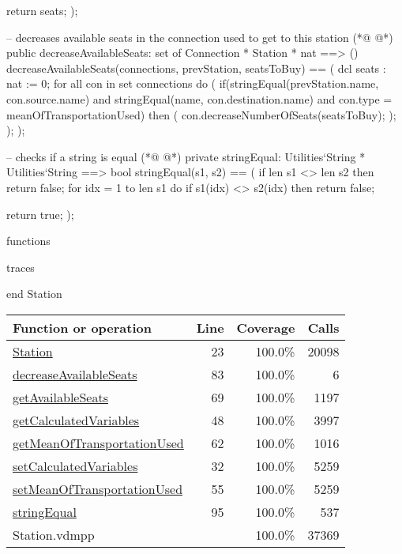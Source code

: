 \begin{vdmpp}[breaklines=true]
  return seats;
 );
 
 -- decreases available seats in the connection used to get to this station
(*@
\label{decreaseAvailableSeats:83}
@*)
 public decreaseAvailableSeats: set of Connection * Station * nat ==> ()
 decreaseAvailableSeats(connections, prevStation, seatsToBuy) ==
 (
  dcl seats : nat := 0;
  for all con in set connections do (
   if(stringEqual(prevStation.name, con.source.name) and stringEqual(name, con.destination.name) and con.type = meanOfTransportationUsed) then (
    con.decreaseNumberOfSeats(seatsToBuy);
   );
  );
 );
 
 -- checks if a string is equal
(*@
\label{stringEqual:95}
@*)
 private stringEqual: Utilities`String * Utilities`String ==> bool
 stringEqual(s1, s2) ==
 (
  if len s1 <> len s2 then
   return false;
  for idx = 1 to len s1 do
   if s1(idx) <> s2(idx) then return false;
  
  return true;
 );

 
functions

traces

end Station
\end{vdmpp}
\bigskip
\begin{longtable}{|l|r|r|r|}
\hline
Function or operation & Line & Coverage & Calls \\
\hline
\hline
\hyperref[Station:23]{Station} & 23&100.0\% & 20098 \\
\hline
\hyperref[decreaseAvailableSeats:83]{decreaseAvailableSeats} & 83&100.0\% & 6 \\
\hline
\hyperref[getAvailableSeats:69]{getAvailableSeats} & 69&100.0\% & 1197 \\
\hline
\hyperref[getCalculatedVariables:48]{getCalculatedVariables} & 48&100.0\% & 3997 \\
\hline
\hyperref[getMeanOfTransportationUsed:62]{getMeanOfTransportationUsed} & 62&100.0\% & 1016 \\
\hline
\hyperref[setCalculatedVariables:32]{setCalculatedVariables} & 32&100.0\% & 5259 \\
\hline
\hyperref[setMeanOfTransportationUsed:55]{setMeanOfTransportationUsed} & 55&100.0\% & 5259 \\
\hline
\hyperref[stringEqual:95]{stringEqual} & 95&100.0\% & 537 \\
\hline
\hline
Station.vdmpp & & 100.0\% & 37369 \\
\hline
\end{longtable}

